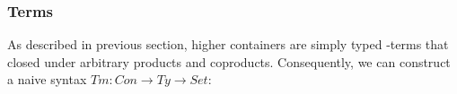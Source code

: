 \begin{code}[hide]%
\>[0]\AgdaSpace{}%
\AgdaSpace{}%
\AgdaSpace{}%
\AgdaSymbol{:}\AgdaSpace{}%
\AgdaSpace{}%
\AgdaSpace{}%
\<%
\end{code}

\subsubsection*{Terms}

As described in previous section, higher containers are simply typed \lambda-terms that closed under arbitrary products and coproducts. Consequently, we can construct a naive syntax $Tm : Con \to Ty \to Set$:

\begin{code}%
\>[0]\AgdaSpace{}%
\AgdaSpace{}%
\AgdaSymbol{:}\AgdaSpace{}%
\AgdaSpace{}%
\AgdaSpace{}%
\AgdaSpace{}%
\AgdaSpace{}%
\AgdaSpace{}%
\<%
\\
\>[0][@{}l@{\AgdaIndent{0}}]%
\>[2]\AgdaSpace{}%
\AgdaSymbol{:}\AgdaSpace{}%
\AgdaSpace{}%
\AgdaSpace{}%
\AgdaSpace{}%
\AgdaSpace{}%
\AgdaSpace{}%
\AgdaSpace{}%
\<%
\\
%
\>[2]\AgdaSpace{}%
\AgdaSymbol{:}\AgdaSpace{}%
\AgdaSpace{}%
\AgdaSymbol{(}\AgdaSpace{}%
\AgdaSpace{}%
\AgdaSymbol{)}\AgdaSpace{}%
\AgdaSpace{}%
\AgdaSpace{}%
\AgdaSpace{}%
\AgdaSpace{}%
\AgdaSymbol{(}\AgdaSpace{}%
\AgdaSpace{}%
\AgdaSymbol{)}\<%
\\
%
\>[2]\AgdaOperator{\AgdaInductiveConstructor{\AgdaUnderscore{}\$\AgdaUnderscore{}}}\AgdaSpace{}%
\AgdaSymbol{:}\AgdaSpace{}%
\AgdaSpace{}%
\AgdaSpace{}%
\AgdaSymbol{(}\AgdaSpace{}%
\AgdaSpace{}%
\AgdaSymbol{)}\AgdaSpace{}%
\AgdaSpace{}%
\AgdaSpace{}%
\AgdaSpace{}%

\end{code}
